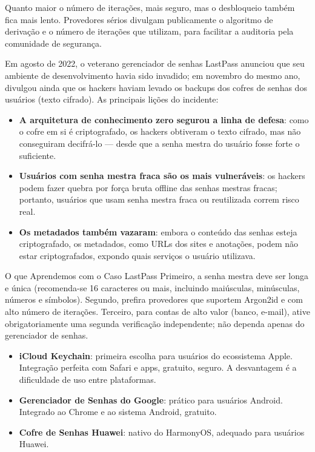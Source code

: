 Quanto maior o número de iterações, mais seguro, mas o desbloqueio também fica mais lento. Provedores sérios divulgam publicamente o algoritmo de derivação e o número de iterações que utilizam, para facilitar a auditoria pela comunidade de segurança.


Em agosto de 2022, o veterano gerenciador de senhas LastPass anunciou que seu ambiente de desenvolvimento havia sido invadido; em novembro do mesmo ano, divulgou ainda que os hackers haviam levado os backups dos cofres de senhas dos usuários (texto cifrado). As principais lições do incidente:

\begin{itemize}
  \item \textbf{A arquitetura de conhecimento zero segurou a linha de defesa}: como o cofre em si é criptografado, os hackers obtiveram o texto cifrado, mas não conseguiram decifrá-lo — desde que a senha mestra do usuário fosse forte o suficiente.
  \item \textbf{Usuários com senha mestra fraca são os mais vulneráveis}: os hackers podem fazer quebra por força bruta offline das senhas mestras fracas; portanto, usuários que usam senha mestra fraca ou reutilizada correm risco real.
  \item \textbf{Os metadados também vazaram}: embora o conteúdo das senhas esteja criptografado, os metadados, como URLs dos sites e anotações, podem não estar criptografados, expondo quais serviços o usuário utilizava.
\end{itemize}

\begin{tcbwarn}{O que Aprendemos com o Caso LastPass}
Primeiro, a senha mestra deve ser longa e única (recomenda-se 16 caracteres ou mais, incluindo maiúsculas, minúsculas, números e símbolos). Segundo, prefira provedores que suportem Argon2id e com alto número de iterações. Terceiro, para contas de alto valor (banco, e-mail), ative obrigatoriamente uma segunda verificação independente; não dependa apenas do gerenciador de senhas.

\end{tcbwarn}



\begin{itemize}
  \item \textbf{iCloud Keychain}: primeira escolha para usuários do ecossistema Apple. Integração perfeita com Safari e apps, gratuito, seguro. A desvantagem é a dificuldade de uso entre plataformas.
  \item \textbf{Gerenciador de Senhas do Google}: prático para usuários Android. Integrado ao Chrome e ao sistema Android, gratuito.
  \item \textbf{Cofre de Senhas Huawei}: nativo do HarmonyOS, adequado para usuários Huawei.
\end{itemize}

